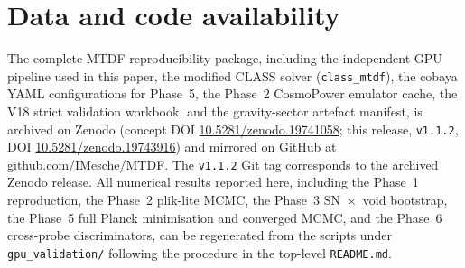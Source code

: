 \documentclass[11pt,a4paper]{article}
\begin{document}
\section{Data and code availability}
\label{sec:data-availability}
The complete MTDF reproducibility package, including the independent GPU
pipeline used in this paper, the modified CLASS solver (\texttt{class\_\allowbreak{}mtdf}),
the cobaya YAML configurations for Phase~5, the Phase~2 CosmoPower emulator
cache, the V18 strict validation workbook, and the gravity-sector artefact
manifest, is archived on Zenodo
(concept DOI \href{https://doi.org/10.5281/zenodo.19741058}{10.5281/\allowbreak{}zenodo.\allowbreak{}19741058};
this release, \texttt{v1.1.2}, DOI
\href{https://doi.org/10.5281/zenodo.19743916}{10.5281/\allowbreak{}zenodo.\allowbreak{}19743916})
and mirrored on GitHub at
\href{https://github.com/IMesche/MTDF}{github.com/\allowbreak{}IMesche/\allowbreak{}MTDF}.
The \texttt{v1.1.2} Git tag corresponds to the archived Zenodo release. All
numerical results reported here, including the Phase~1 reproduction, the
Phase~2 plik-lite MCMC, the Phase~3 SN~$\times$~void bootstrap, the Phase~5
full Planck minimisation and converged MCMC, and the Phase~6 cross-probe
discriminators, can be regenerated from the scripts under
\texttt{gpu\_\allowbreak{}validation/} following the procedure in the
top-level \texttt{README.md}.
\end{document}
